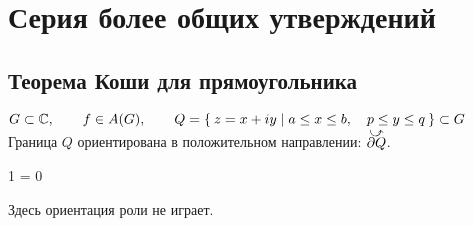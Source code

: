 \section{Серия более общих утверждений}

\subsection{Теорема Коши для прямоугольника}

\begin{theorem}
	$ G \subset \mathbb{C}, \qquad f \in A(G), \qquad Q = \Set{z = x + iy \mid a \le x \le b, \quad p \le y \le q} \subset G $ \\
	Граница $ Q $ ориентирована в положительном направлении: $ \curvedir{\partial Q} $.
	\begin{equ}1
 		\implies {} = 0
	\end{equ}
\end{theorem}

\begin{note}
	Здесь ориентация роли не играет.
\end{note}

